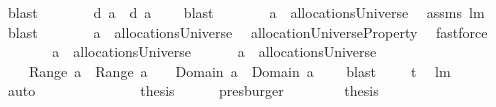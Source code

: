 \begin{isabellebody}
\ blast\isanewline
\ \ \ \ \isamarkupfalse%
\ \isamarkupfalse%
\ {\isachardoublequoteopen}{\isacharquery}d\ {\isacharquery}a{}\ {\isasyminter}\ {\isacharparenleft}{\isacharquery}d\ {\isacharquery}a{}{\isacharparenright}\ {\isacharequal}\ {\isacharbraceleft}{\isacharbraceright}{\isachardoublequoteclose}\ \isamarkupfalse%
\ blast\isanewline
\ \ \ \ \isamarkupfalse%
\ \isamarkupfalse%
\ {\isachardoublequoteopen}{\isacharquery}a{}\ {\isasymin}\ allocationsUniverse{\isachardoublequoteclose}\ \isamarkupfalse%
\ assms{\isacharparenleft}{}{\isacharparenright}\ lm{}{}\ \isamarkupfalse%
\ blast\isanewline
\ \ \ \ \isamarkupfalse%
\ \isamarkupfalse%
\ {\isachardoublequoteopen}{\isacharquery}a{}\ {\isasymin}\ allocationsUniverse{\isachardoublequoteclose}\ \isamarkupfalse%
\ allocationUniverseProperty\ \isamarkupfalse%
\ fastforce\isanewline
\ \ \ \ \isamarkupfalse%
\ \isamarkupfalse%
\ {\isachardoublequoteopen}{\isacharquery}a{}\ {\isasymin}\ allocationsUniverse\ {\isacharampersand}\ \isanewline
\ \ \ \ {\isacharquery}a{}\ {\isasymin}\ allocationsUniverse\ {\isacharampersand}\isanewline
\ \ \ \ {\isasymUnion}Range\ {\isacharquery}a{}\ {\isasyminter}\ {\isasymUnion}Range\ {\isacharquery}a{}\ {\isacharequal}\ {\isacharbraceleft}{\isacharbraceright}\ {\isacharampersand}\ Domain\ {\isacharquery}a{}\ {\isasyminter}\ Domain\ {\isacharquery}a{}\ {\isacharequal}\ {\isacharbraceleft}{\isacharbraceright}{\isachardoublequoteclose}\ \isanewline
{}\isamarkupfalse%
\ blast\ \isamarkupfalse%
\ \isamarkupfalse%
\ \isanewline
{\isacharquery}t{}\ \isamarkupfalse%
\ lm{}{}\ \isamarkupfalse%
\ auto\ \ \ \ \ \ \ \isanewline
\ \ \ \ \isamarkupfalse%
\ \isamarkupfalse%
\ {\isacharquery}thesis\ \isamarkupfalse%
\ {}\ {}\ \isamarkupfalse%
\ presburger\isanewline
\ \ \isacommand{{\isacharbraceright}}\isamarkupfalse%
\isanewline
\ \ \isamarkupfalse%
\ \isamarkupfalse%
\ {\isacharquery}thesis\ \isamarkupfalse%
\ {}\ \isamarkupfalse%

\end{isabellebody}
